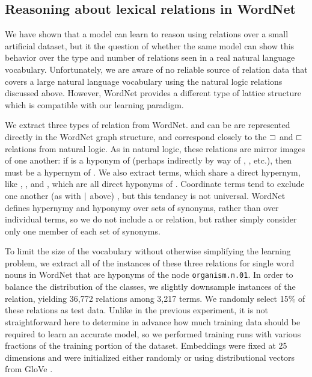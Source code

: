 \subsection*{Reasoning about lexical relations in WordNet}\label{sec:wordnet}

We have shown that a model can learn to reason using relations over a small artificial dataset, 
but it the question of whether the same model can show this behavior over the type and number of
relations seen in a real natural language vocabulary.
Unfortunately, we are aware of no reliable source of relation data that covers a large natural 
language vocabulary using the natural logic relations discussed above. However, WordNet 
\cite{fellbaum2010wordnet} provides a different type of lattice structure which is compatible with
our learning paradigm.

We extract three types of relation from WordNet.  and  can be are represented
directly in the WordNet graph structure, and correspond closely to the $\sqsupset$ and $\sqsubset$ relations from
natural logic. As in natural logic, these relations are mirror images of one another: if  is a
hyponym of  (perhaps indirectly by way of , , etc.), then  must be a 
hypernym of . We also extract  terms, which share
a direct hypernym, like , , and , which are all direct hyponyms of . 
Coordinate terms tend to exclude one another (as with $\mathbin{|}$ above) \cite{Hurford:1974}, but this tendancy
is not universal. WordNet defines hypernymy and hyponymy over sets of synonyms, rather than over individual 
terms, so we do not include a  or  relation, but rather simply consider only one
member of each set of synonyms.

To limit the size of the vocabulary without otherwise simplifying the learning problem, we extract all of the
instances of these three relations for single word nouns in WordNet that are hyponyms of the node 
\texttt{organism.n.01}. In order to balance the distribution of the classes, we slightly downsample instances 
of the  relation, yielding 36,772 relations among 3,217 terms. We randomly select 15\% of these 
relations as test data. Unlike in the previous experiment, it is not straightforward here to determine in advance
 how much training data should be required to learn an accurate model, so we performed training runs with 
 various fractions of the training portion of the 
dataset. Embeddings were fixed at 25 dimensions and were initialized either randomly or using distributional 
vectors from GloVe \cite{pennington2014glove}.

